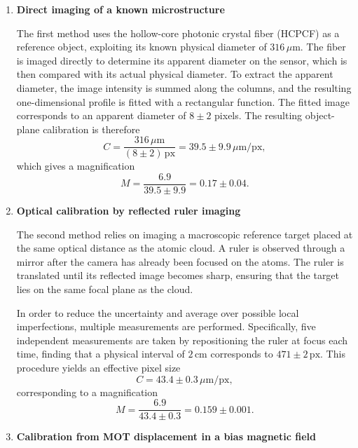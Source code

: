 \begin{enumerate}

\item \textbf{Direct imaging of a known microstructure}

The first method uses the hollow-core photonic crystal fiber (HCPCF) as a reference object, exploiting its known physical diameter of $316\,\mu\mathrm{m}$. The fiber is imaged directly to determine its apparent diameter on the sensor, which is then compared with its actual physical diameter. To extract the apparent diameter, the image intensity is summed along the columns, and the resulting one-dimensional profile is fitted with a rectangular function.
The fitted image corresponds to an apparent diameter of $8 \pm 2$ pixels. The resulting object-plane calibration is therefore
\begin{equation}
    C = \frac{316\,\mu\mathrm{m}}{(8 \pm 2)\,\mathrm{px}} = 39.5 \pm 9.9\,\mu\mathrm{m/px},
\end{equation}
which gives a magnification
\begin{equation}
    M = \frac{6.9}{39.5 \pm 9.9} = 0.17 \pm 0.04.
\end{equation}

\item \textbf{Optical calibration by reflected ruler imaging}

The second method relies on imaging a macroscopic reference target placed at the same optical distance as the atomic cloud. A ruler is observed through a mirror after the camera has already been focused on the atoms. The ruler is translated until its reflected image becomes sharp, ensuring that the target lies on the same focal plane as the cloud.

In order to reduce the uncertainty and average over possible local imperfections, multiple measurements are performed. Specifically, five independent measurements are taken by repositioning the ruler at focus each time, finding that a physical interval of $2\,\mathrm{cm}$ corresponds to $471 \pm 2\,\mathrm{px}$. This procedure yields an effective pixel size
\begin{equation}
    C = 43.4 \pm 0.3\,\mu\mathrm{m/px},
\end{equation}
corresponding to a magnification
\begin{equation}
    M = \frac{6.9}{43.4 \pm 0.3} = 0.159 \pm 0.001.
\end{equation}
\item \textbf{Calibration from MOT displacement in a bias magnetic field}


\end{enumerate}
